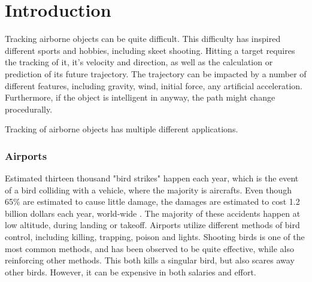 
\chapter{Introduction}

Tracking airborne objects can be quite difficult.
This difficulty has inspired different sports and hobbies, including skeet shooting.
Hitting a target requires the tracking of it, it's velocity and direction, as well as the calculation or prediction of its future trajectory.
The trajectory can be impacted by a number of different features, including gravity, wind, initial force, any artificial acceleration. 
Furthermore, if the object is intelligent in anyway, the path might change procedurally.


Tracking of airborne objects has multiple different applications.

\subsection{Airports}
Estimated thirteen thousand "bird strikes" happen each year, which is the event of a bird colliding with a vehicle, where the majority is aircrafts\cite{WikiBirdStrike}\cite{WildlifeStrikeReport}.
Even though 65\% are estimated to cause little damage, the damages are estimated to cost 1.2 billion dollars each year, world-wide \cite{CostOfBirdstrikes}.
The majority of these accidents happen at low altitude, during landing or takeoff\cite{CostOfBirdstrikes}.
Airports utilize different methods of bird control, including killing, trapping, poison and lights\cite{BirdControlAtAirports}.
Shooting birds is one of the most common methods, and has been observed to be quite effective, while also reinforcing other methods.
This both kills a singular bird, but also scares away other birds.
However, it can be expensive in both salaries and effort.

